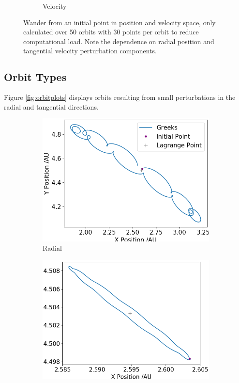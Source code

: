 \documentclass[11pt, a4paper,twocolumn]{article} %
\begin{document}
\begin{figure}[ht]
\begin{subfigure}{.45\textwidth}
		\caption{Velocity}
		\label{fig:velocity_mesh}
	\end{subfigure}
	\caption{Wander from an initial point in position and velocity space, only calculated over 50 orbits with 30 points per orbit to reduce computational load. Note the dependence on radial position and tangential velocity perturbation components. }
	\label{fig:mesh_plots}
\end{figure}

\subsection{Orbit Types} \label{orbits}
Figure \ref{fig:orbitplots} displays orbits resulting from small perturbations in the radial and tangential directions.

\begin{figure}[ht]
	\centering
	\begin{subfigure}{.23\textwidth}
		\centering
		\includegraphics[width=\linewidth]{Figures/radialp_orbits}  
		\caption{Radial}
		\label{fig:orbit_rad}
	\end{subfigure}
	\hfill %
	\begin{subfigure}{.23\textwidth}
		\centering
		\includegraphics[width=\linewidth]{Figures/tangentialp_orbits}  

\end{subfigure}
\end{figure}
\end{document}
